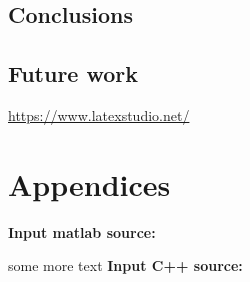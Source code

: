 \documentclass{mcmthesis}
\begin{document}
\subsection{Conclusions}
\lipsum[59]
\subsection{Future work}
\lipsum[60]

\newpage
{}
\begin{thebibliography}{99}
   \url{https://www.latexstudio.net/}
\end{thebibliography}
\section*{Appendices}



\textbf{\textcolor[rgb]{0.98,0.00,0.00}{Input matlab source:}}


some more text \textcolor[rgb]{0.98,0.00,0.00}{\textbf{Input C++ source:}}


\end{document}
